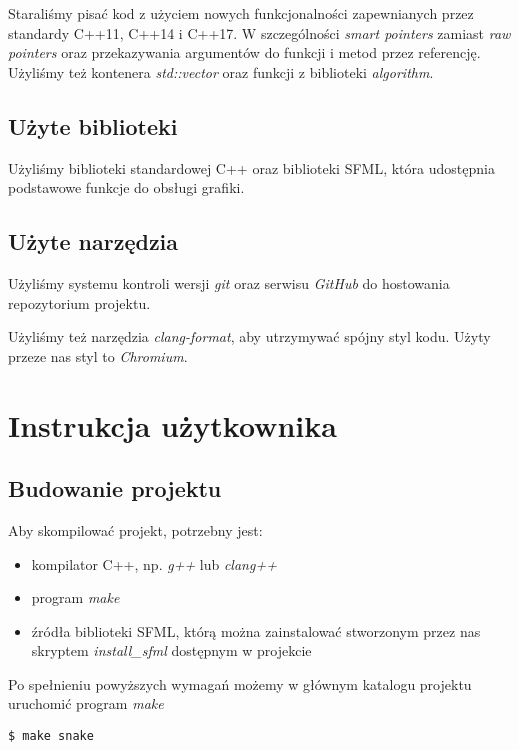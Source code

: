 \documentclass[12pt]{article}
\begin{document}
Staraliśmy pisać kod z użyciem nowych funkcjonalności zapewnianych przez
standardy C++11, C++14 i C++17. W szczególności \textit{smart pointers}
zamiast \textit{raw pointers} oraz przekazywania argumentów do funkcji i metod
przez referencję. Użyliśmy też kontenera \textit{std::vector} oraz funkcji z
biblioteki \textit{algorithm}.

\subsection{Użyte biblioteki}

Użyliśmy biblioteki standardowej C++ oraz biblioteki SFML, która udostępnia
podstawowe funkcje do obsługi grafiki.

\subsection{Użyte narzędzia}

Użyliśmy systemu kontroli wersji \textit{git} oraz serwisu \textit{GitHub} do
hostowania repozytorium projektu.

Użyliśmy też narzędzia \textit{clang-format}, aby utrzymywać spójny styl kodu.
Użyty przeze nas styl to \textit{Chromium}.

\section{Instrukcja użytkownika}

\subsection{Budowanie projektu}
Aby skompilować projekt, potrzebny jest:
\begin{itemize}
    \item kompilator C++, np. \textit{g++} lub \textit{clang++}

    \item program \textit{make}

    \item źródła biblioteki SFML, którą można zainstalować stworzonym przez
          nas skryptem \textit{install\_sfml} dostępnym w projekcie
\end{itemize}

Po spełnieniu powyższych wymagań możemy w głównym katalogu projektu uruchomić
program \textit{make}


\begin{lstlisting}
$ make snake
\end{lstlisting}
\end{document}
